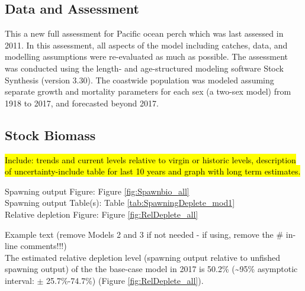 \documentclass[12pt,]{article}
\begin{document}
\subsection*{Data and Assessment}\label{data-and-assessment}

This a new full assessment for Pacific ocean perch which was last
assessed in 2011. In this assessment, all aspects of the model including
catches, data, and modelling assumptions were re-evaluated as much as
possible. The assessment was conducted using the length- and
age-structured modeling software Stock Synthesis (version 3.30). The
coastwide population was modeled assuming separate growth and mortality
parameters for each sex (a two-sex model) from 1918 to 2017, and
forecasted beyond 2017.

\FloatBarrier

\subsection*{Stock Biomass}\label{stock-biomass}

\hl{Include: trends and current levels relative to virgin or historic levels, 
description of uncertainty-include table for last 10 years and graph with 
long term estimates.}

Spawning output Figure: Figure \ref{fig:Spawnbio_all}\\
Spawning output Table(s): Table \ref{tab:SpawningDeplete_mod1}\\
Relative depletion Figure: Figure \ref{fig:RelDeplete_all}

Example text (remove Models 2 and 3 if not needed - if using, remove the
\# in-line comments!!!)\\
The estimated relative depletion level (spawning output relative to
unfished spawning output) of the the base-case model in 2017 is 50.2\%
(\textasciitilde{}95\% asymptotic interval: \(\pm\) 25.7\%-74.7\%)
(Figure \ref{fig:RelDeplete_all}).

\FloatBarrier
\end{document}
